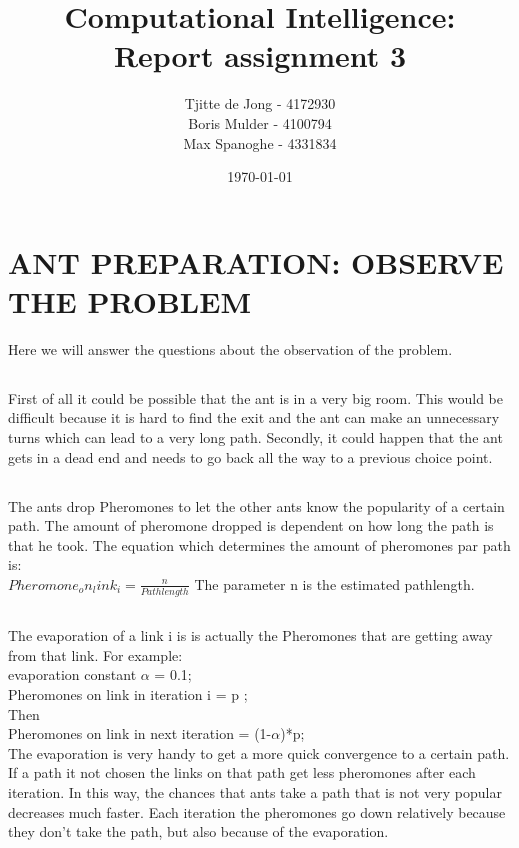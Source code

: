 \documentclass{scrartcl}
\begin{document}
\title{Computational Intelligence:
\\Report assignment 3}
\date{\today{}}

\author{
    \begin{tabular}{l r}
    	\\Tjitte de Jong - 4172930
	\\Boris Mulder - 4100794
        \\Max Spanoghe - 4331834
            \end{tabular}
  }
  
\maketitle \thispagestyle{empty} \pagebreak
  
\section{ANT PREPARATION: OBSERVE THE PROBLEM}
  Here we will answer the questions about the observation of the problem.
  
\subsection{}
First of all it could be possible that the ant is in a very big room. This would be difficult because it is hard to find the exit and the ant can make an unnecessary turns which can lead to a very long path.
Secondly, it could happen that the ant gets in a dead end and needs to go back all the way to a previous choice point.

\subsection{}
The ants drop Pheromones to let the other ants know the popularity of a certain path. The amount of pheromone dropped is dependent on how long the path is that he took. The equation which determines the amount of pheromones par path is: \\
$Pheromone_on_link_i = \frac{n}{Path length}$
The parameter n is the estimated pathlength.

\subsection{}
 The evaporation of a link i is is actually the Pheromones that are getting away from that link. For example:\\
 evaporation constant $\alpha$ = 0.1;\\
 Pheromones on link in iteration i = p ;\\
 Then \\
 Pheromones on link in next iteration = (1-$\alpha$)*p;\\
 The evaporation is very handy to get a more quick convergence to a certain path. If a path it not chosen the links on that path get less pheromones after each iteration. In this way, the chances that ants take a path that is not very popular decreases much faster. Each iteration the pheromones go down relatively because they don't take the path, but also because of the evaporation.
 
\end{document}
